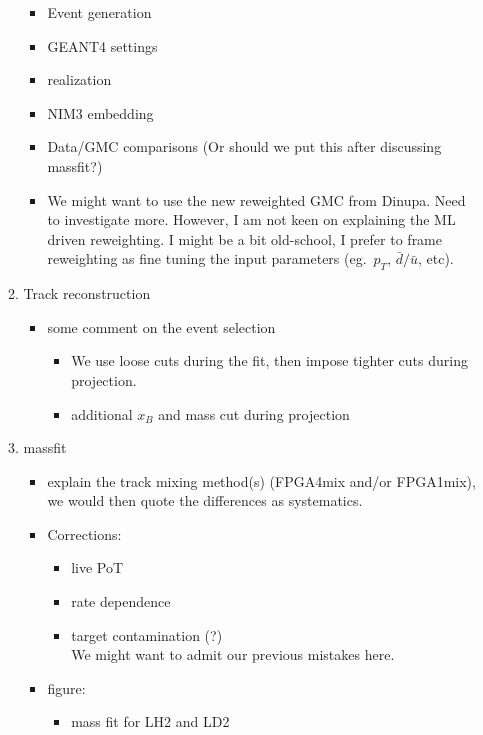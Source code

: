 \documentclass{article}
\begin{document}
\begin{enumerate}
\begin{enumerate}
\begin{itemize}
            \item Event generation
            \item GEANT4 settings
            \item realization
            \item NIM3 embedding
            \item Data/GMC comparisons (Or should we put this after discussing massfit?)
            \item We might want to use the new reweighted GMC from Dinupa. Need to investigate more.
                However, I am not keen on explaining the ML driven reweighting.
                I might be a bit old-school, I prefer to frame reweighting as fine tuning the input parameters (eg.~$p_T,\,\bar{d}/\bar{u}$, etc).
        \end{itemize}
        \item Track reconstruction
        \begin{itemize}
            \item some comment on the event selection
            \begin{itemize}
                \item We use loose cuts during the fit, then impose tighter cuts during projection.
                \item additional $x_B$ and mass cut during projection
            \end{itemize}
        \end{itemize}
        \item massfit
        \begin{itemize}
            \item explain the track mixing method(s) (FPGA4mix and/or FPGA1mix), we would then quote the differences as systematics.
            \item Corrections:
            \begin{itemize}
                \item live PoT
                \item rate dependence
                \item target contamination (?)\\
                    We might want to admit our previous mistakes here.
            \end{itemize}
            \item figure:
            \begin{itemize}
                \item mass fit for LH2 and LD2

\end{itemize}
\end{itemize}
\end{enumerate}
\end{enumerate}
\end{document}
